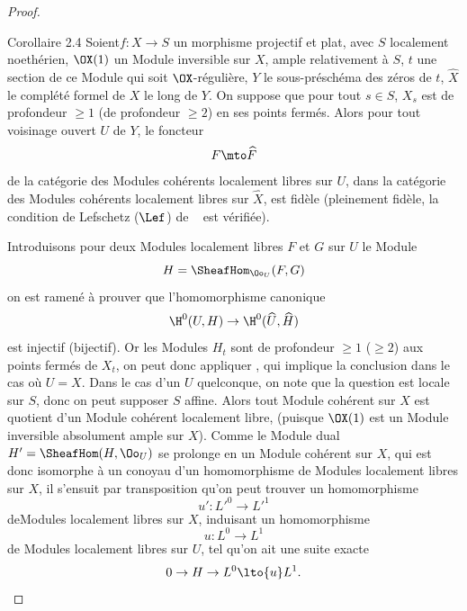 \begin{proof}
\label{XII.2.4}
\begin{enonce*}{Corollaire 2.4\ndemark}
Soient\pageoriginale $f:X\to S$ un morphisme projectif et plat, avec $S$ localement noeth\'erien, $\OX(1)$ un Module inversible sur $X$, ample relativement \`a $S$, $t$ une section de ce Module qui soit $\OX$-r\'eguli\`ere, $Y$ le sous-pr\'esch\'ema des z\'eros de $t$, $\widehat{X}$ le compl\'et\'e formel de $X$ le long de $Y$. On suppose que pour tout $s\in S$, $X_s$ est de profondeur $\geq 1$ (\resp de profondeur $\geq 2$) en ses points ferm\'es. Alors pour tout voisinage ouvert $U$ de $Y$, le foncteur
\[
F \mto \widehat{F}
\]
de la cat\'egorie des Modules coh\'erents localement libres sur $U$, dans la cat\'egorie des Modules coh\'erents localement libres sur $\widehat{X}$, est fid\`ele (\resp pleinement fid\`ele, \ie la condition de Lefschetz ($\Lef$) de ~ est v\'erifi\'ee).
\end{enonce*}
Introduisons pour deux Modules localement libres $F$ et $G$ sur $U$ le Module
\[
H=\SheafHom_{\Oo_U}(F, G)
\]
on est ramen\'e \`a prouver que l'homomorphisme canonique
\steco
\begin{equation} \label{eq:XII.15} {}\H^0(U, H) \to \H^0(\widehat{U}, \widehat{H})
\end{equation}
est injectif (\resp bijectif). Or les Modules $H_t$ sont de profondeur $\geq 1$ (\resp $\geq 2$) aux points ferm\'es de $X_t$, on peut donc appliquer , qui implique la conclusion  dans le cas o\`u $U=X$. Dans le cas d'un $U$ quelconque, on note que la question est locale sur $S$, donc on peut supposer $S$ affine. Alors tout Module coh\'erent sur $X$ est quotient d'un Module coh\'erent localement libre, (puisque $\OX(1)$ est un Module inversible absolument ample sur $X$). Comme le Module dual $H'=\SheafHom(H, \Oo_U)$ se prolonge en un Module coh\'erent sur $X$, qui est donc isomorphe \`a un conoyau d'un homomorphisme de Modules localement libres sur $X$, il s'ensuit par transposition qu'on peut trouver un homomorphisme
\[
u':{L'}^0 \to {L'}^1
\]
de\pageoriginale Modules localement libres sur $X$, induisant un homomorphisme
\[
u:L^0 \to L^1
\]
de Modules localement libres sur $U$, tel qu'on ait une suite exacte
\[
0\to H \to L^0 \lto{u} L^1.
\]
\end{proof}
